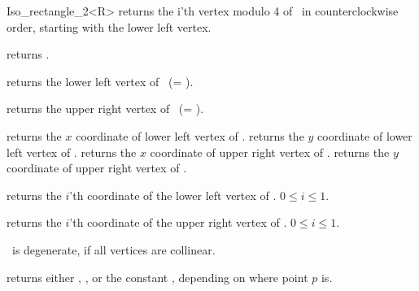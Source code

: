 \begin{ccRefClass} {Iso_rectangle_2<R>}
       {returns the i'th vertex modulo 4  of \ccVar\ in counterclockwise order, 
        starting with the lower left vertex.}

       {returns  .}

       {returns the lower left vertex of \ccVar\ (= ).}


       {returns the upper right vertex of \ccVar\ (= ).}

       {returns the $x$ coordinate of lower left vertex of \ccVar.}
\ccGlue
{}
       {returns the $y$ coordinate of lower left vertex of \ccVar.}
\ccGlue
{}
       {returns the $x$ coordinate of upper right vertex of \ccVar.}
\ccGlue
{}
       {returns the $y$ coordinate of upper right vertex of \ccVar.}

       {returns the $i$'th  coordinate of the
        lower left vertex of \ccVar. 
        \ccPrecond $0 \leq i \leq 1$.}

       {returns the $i$'th  coordinate of the
        upper right vertex of \ccVar. 
        \ccPrecond $0 \leq i \leq 1$.}

\ccPredicates

       {%
        \ccVar\ is degenerate, if all vertices
        are collinear.}

       {returns either ,
        , or the constant
        , 
        depending on where point $p$ is.}

       {}
\ccGlue
{}
       {}
\ccGlue
{}
       {}



\end{ccRefClass}
